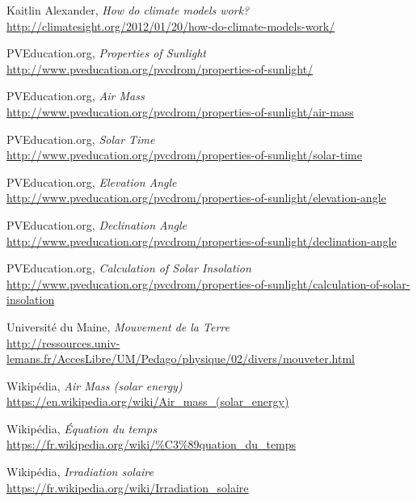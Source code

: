 \documentclass[12pt]{article}
\begin{document}
\clearpage
\begin{thebibliography}{99}

	Kaitlin Alexander,
	\emph{How do climate models work?}\\
	\url{http://climatesight.org/2012/01/20/how-do-climate-models-work/}

	PVEducation.org,
	\emph{Properties of Sunlight}\\
	\url{http://www.pveducation.org/pvcdrom/properties-of-sunlight/}

	PVEducation.org,
	\emph{Air Mass}\\
	\url{http://www.pveducation.org/pvcdrom/properties-of-sunlight/air-mass}

	PVEducation.org,
	\emph{Solar Time}\\
	\url{http://www.pveducation.org/pvcdrom/properties-of-sunlight/solar-time}

	PVEducation.org,
	\emph{Elevation Angle}\\
	\url{http://www.pveducation.org/pvcdrom/properties-of-sunlight/elevation-angle}

	PVEducation.org,
	\emph{Declination Angle}\\
	\url{http://www.pveducation.org/pvcdrom/properties-of-sunlight/declination-angle}

	PVEducation.org,
	\emph{Calculation of Solar Insolation}\\
	\url{http://www.pveducation.org/pvcdrom/properties-of-sunlight/calculation-of-solar-insolation}

	Université du Maine,
	\emph{Mouvement de la Terre}\\
	\url{http://ressources.univ-lemans.fr/AccesLibre/UM/Pedago/physique/02/divers/mouveter.html}

	Wikipédia,
	\emph{Air Mass (solar energy)}\\
	\url{https://en.wikipedia.org/wiki/Air_mass_(solar_energy)}

	Wikipédia,
	\emph{Équation du temps}\\
	\url{https://fr.wikipedia.org/wiki/%C3%89quation_du_temps}
	
	Wikipédia,
	\emph{Irradiation solaire}\\
	\url{https://fr.wikipedia.org/wiki/Irradiation_solaire}
	

\end{thebibliography}
\end{document}
